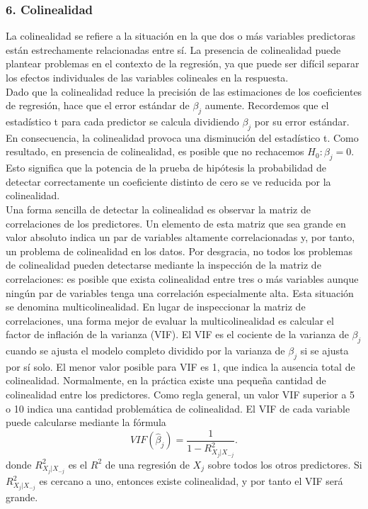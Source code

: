  \subsubsection{6. Colinealidad}
 La colinealidad se refiere a la situación en la que dos o más variables predictoras están estrechamente relacionadas entre sí. La presencia de colinealidad puede plantear problemas en el contexto de la regresión, ya que puede ser difícil separar los efectos individuales de las variables colineales en la respuesta.\\

 Dado que la colinealidad reduce la precisión de las estimaciones de los coeficientes de regresión, hace que el error estándar de $\beta_j$ aumente. Recordemos que el estadístico t para cada predictor se calcula dividiendo $\beta_j$ por su error estándar. En consecuencia, la colinealidad provoca una disminución del estadístico t. Como resultado, en presencia de colinealidad, es posible que no rechacemos $H_0 : \beta_j = 0$. Esto significa que la potencia de la prueba de hipótesis la probabilidad de detectar correctamente un coeficiente distinto de cero se ve reducida por la colinealidad.\\

 Una forma sencilla de detectar la colinealidad es observar la matriz de correlaciones de los predictores. Un elemento de esta matriz que sea grande en valor absoluto indica un par de variables altamente correlacionadas y, por tanto, un problema de colinealidad en los datos. Por desgracia, no todos los problemas de colinealidad pueden detectarse mediante la inspección de la matriz de correlaciones: es posible que exista colinealidad entre tres o más variables aunque ningún par de variables tenga una correlación especialmente alta. Esta situación se denomina multicolinealidad. En lugar de inspeccionar la matriz de correlaciones, una forma mejor de evaluar la multicolinealidad es calcular el factor de inflación de la varianza (VIF). El VIF es el cociente de la varianza de $\beta_j$ cuando se ajusta el modelo completo dividido por la varianza de $\beta_j$ si se ajusta por sí solo. El menor valor posible para VIF es 1, que indica la ausencia total de colinealidad. Normalmente, en la práctica existe una pequeña cantidad de colinealidad entre los predictores. Como regla general, un valor VIF superior a 5 o 10 indica una cantidad problemática de colinealidad. El VIF de cada variable puede calcularse mediante la fórmula
 $$VIF(\hat{\beta}_j)=\dfrac{1}{1-R_{X_j|X_{-j}}^2}.$$
 donde $R^2_{X_j|X_{-j}}$ es el $R^2$ de una regresión de $X_j$ sobre todos los otros predictores. Si $R^2_{X_j|X_{-j}}$ es cercano a uno, entonces existe colinealidad, y por tanto el VIF será grande.\\

